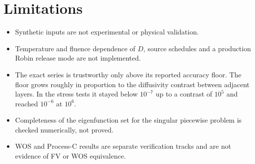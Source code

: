\documentclass[11pt]{article}
\begin{document}
\section{Limitations}
\begin{itemize}
\item Synthetic inputs are not experimental or physical validation.
\item Temperature and fluence dependence of $D$, source schedules and a production Robin release mode are not implemented.
\item The exact series is trustworthy only above its reported accuracy floor. The floor grows roughly in proportion to the diffusivity contrast between adjacent layers. In the stress tests it stayed below $10^{-7}$ up to a contrast of $10^{5}$ and reached $10^{-6}$ at $10^{6}$.
\item Completeness of the eigenfunction set for the singular piecewise problem is checked numerically, not proved.
\item WOS and Process-C results are separate verification tracks and are not evidence of FV or WOS equivalence.
\end{itemize}
\end{document}
